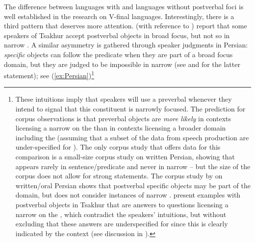 \documentclass[output=paper,colorlinks,citecolor=brown]{langscibook}
\begin{document}
The difference between languages with and languages without postverbal foci is well established in the research on V-final languages. Interestingly, there is a third pattern that deserves more attention. \citet[243]{forker_word_2016} (with reference to \citealt[]{testelec_porjadok_1999}) report that some speakers of Tsakhur accept postverbal objects in broad focus, but not so in narrow . A similar asymmetry is gathered through speaker judgments in Persian: \textit{specific} objects can follow the predicate when they are part of a broad focus domain, but they are judged to be impossible in narrow  (see \citealt[115]{karimi_object_2003} and \citealt[68, 138--139]{sadat-tehrani_intonational_2007} for the latter statement); see (\ref{ex:Persian})\footnote{These intuitions imply that speakers will use a preverbal  whenever they intend to signal that this constituent is narrowly focused. The prediction for corpus observations is that preverbal objects are \textit{more likely} in contexts licensing a narrow  on the  than in contexts licensing a broader  domain including the  (assuming that a subset of the data from speech production are under-specified for ). The only corpus study that offers data for this comparison is a small-size corpus study on written Persian, showing that  appears rarely in sentence/predicate  and never in narrow  \citep[861]{majidi_information_2012} -- but the size of the corpus does not allow for strong statements. The corpus study by \citet[139--141]{roberts_study_2009} on written/oral Persian shows that postverbal specific objects may be part of the  domain, but does not consider instances of narrow . \citet[243]{forker_word_2016} present examples with postverbal objects in Tsakhur that are answers to questions licensing a narrow  on the , which contradict the speakers' intuitions, but without excluding that these answers are underspecified for  since this is clearly indicated by the context (see discussion in ).}
\end{document}

